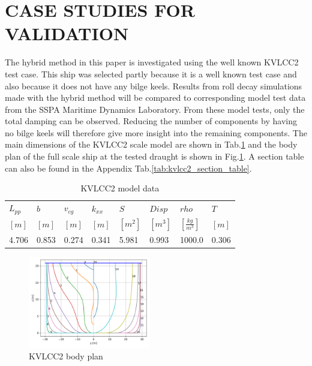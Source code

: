 \section*{CASE STUDIES FOR VALIDATION}\label{case-studies-for-validation}
\label{se:validation}
The hybrid method in this paper is investigated using the well known
KVLCC2 test case. This ship was selected partly because it is a well
known test case and also because it does not have any bilge keels.
Results from roll decay simulations made with the hybrid method will be
compared to corresponding model test data from the SSPA Maritime
Dynamics Laboratory. From these model tests, only the total damping can
be observed. Reducing the number of components by having no bilge keels
will therefore give more insight into the remaining components. The main
dimensions of the KVLCC2 scale model are shown in
Tab.\ref{tab:kvlcc2_model_data} and the body plan of the full
scale ship at the tested draught is shown in
Fig.\ref{fig:body_plan}. A section table can also be found in
the Appendix Tab.\ref{tab:kvlcc2_section_table}.
\begin{table}[H]
\scriptsize
\center
\caption{KVLCC2 model data}
\label{tab:kvlcc2_model_data}
\begin{tabular}{|l|l|l|l|l|l|l|l|}
\hline\addlinespace
$L_{pp}$ & $b$ & $v_{cg}$ & $k_{xx}$ & $S$ & $Disp$ & $rho$ & $T$\\
$[m]$ & $[m]$ & $[m]$ & $[m]$ & $[m^2]$ & $[m^3]$ & $\left[\frac{kg}{m^3}\right]$ & $[m]$\\
\hline4.706 & 0.853 & 0.274 & 0.341 & 5.981 & 0.993 & 1000.0 & 0.306\\
\hline
\end{tabular}
\end{table}
\begin{figure}[H]
\begin{center}\includegraphics[width = 0.475\textwidth]{figures/body_plan.png}\end{center}
\vspace{-0.7cm}
\caption{KVLCC2 body plan}
\label{fig:body_plan}
\end{figure}
